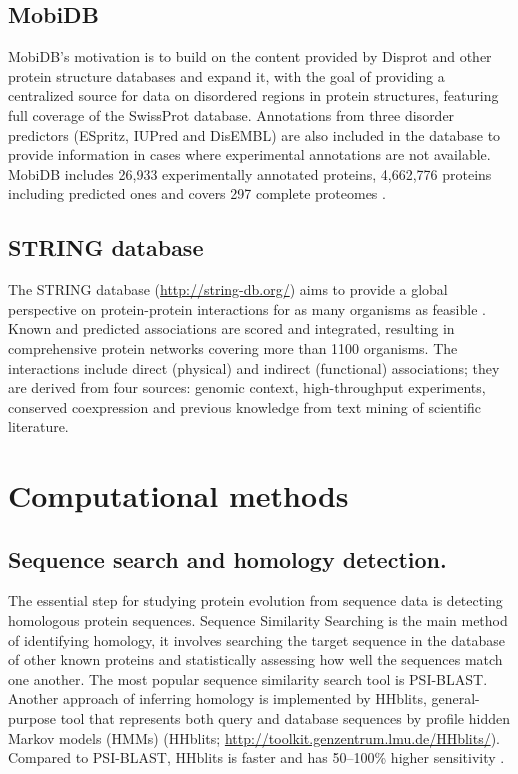 \documentclass[11pt, a4paper,oneside]{report}
\begin{document}
\subsection{MobiDB}
MobiDB's motivation is to build on the content provided by Disprot and other protein structure databases and expand it, with the goal of providing a centralized source for data on disordered regions in protein structures, featuring full coverage of the SwissProt database. Annotations from three disorder predictors (ESpritz, IUPred and DisEMBL) are also included in the database to provide information in cases where experimental annotations are not available. MobiDB includes 26,933 experimentally annotated proteins, 4,662,776 proteins including predicted ones and covers 297 complete proteomes \cite{DiDomenico2012}.
\subsection{STRING database}
The STRING database (\url{http://string-db.org/}) aims to provide a global perspective on protein-protein interactions for as many organisms as feasible \cite{Franceschini2013}. Known and predicted associations are scored and integrated, resulting in comprehensive protein networks covering more than 1100 organisms. The interactions include direct (physical) and indirect (functional) associations; they are derived from four sources: genomic context, high-throughput experiments, conserved coexpression and previous knowledge from text mining of scientific literature.

\section{Computational methods}
\subsection{Sequence search and homology detection.} 
The essential step for studying protein evolution from sequence data is detecting homologous protein sequences. Sequence Similarity Searching is the main method of identifying homology, it involves searching the target sequence in the database of other known proteins and statistically assessing how well the sequences match one another. The most popular sequence similarity search tool is PSI-BLAST. Another approach of inferring homology is implemented by HHblits, general-purpose tool that represents both query and database sequences by profile hidden Markov models (HMMs) (HHblits; \url{http://toolkit.genzentrum.lmu.de/HHblits/}). Compared to PSI-BLAST, HHblits is faster and has 50--100\% higher sensitivity \cite{Remmert2012}.  
\end{document}
